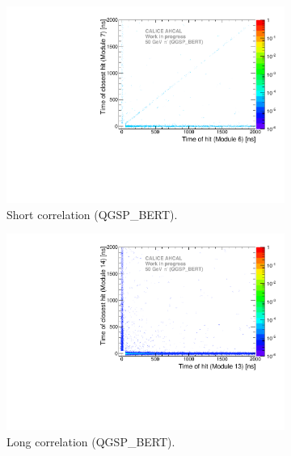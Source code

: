 \begin{figure}[htbp!]
  \begin{subfigure}[t]{0.49\textwidth}
    \centering
    \includegraphics[width=1\textwidth]{../Thesis_Plots/Timing/Pions/Plots/ComparisonToSim/Time_Correlation_50GeV_short_QGSPBERT.pdf}
    \caption{Short correlation (QGSP\_BERT).}\label{fig:Corr_short_QGSPBERT}
  \end{subfigure}
  \hfill
  \begin{subfigure}[t]{0.49\textwidth}
    \centering
    \includegraphics[width=1\textwidth]{../Thesis_Plots/Timing/Pions/Plots/ComparisonToSim/Time_Correlation_50GeV_long_QGSPBERT.pdf}
    \caption{Long correlation (QGSP\_BERT).} \label{fig:Corr_long_QGSPBERT}
  \end{subfigure}
  \hfill
  \begin{subfigure}[t]{0.49\textwidth}

\end{subfigure}
\end{figure}
